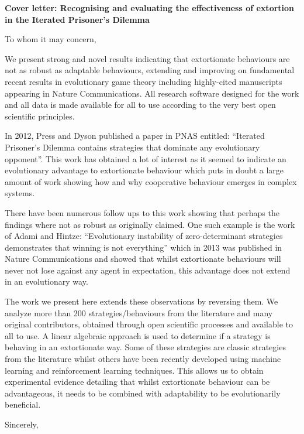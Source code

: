 \documentclass[11pt]{letter}
\begin{document}
\signature{The authors}

\begin{letter}{}

\textbf{Cover letter: Recognising and evaluating the effectiveness
       of extortion in the Iterated Prisoner's Dilemma}

To whom it may concern,

We present strong and novel results indicating that extortionate behaviours are
not as robust as adaptable behaviours, extending and improving on fundamental
recent results in evolutionary game theory including highly-cited manuscripts
appearing in Nature Communications. All research software designed for the work
and all data is made available for all to use according to the very best open
scientific principles.

In 2012, Press and Dyson published a paper in PNAS entitled: ``Iterated
Prisoner’s Dilemma contains strategies that dominate any evolutionary
opponent''. This work has obtained a lot of interest as it seemed to indicate an
evolutionary advantage to extortionate behaviour which puts in doubt a
large amount of work showing how and why cooperative behaviour emerges in
complex systems.

There have been numerous follow ups to this work showing that perhaps the
findings where not as robust as originally claimed. One such example is the work
of Adami and Hintze: ``Evolutionary instability of zero-determinant strategies
demonstrates that winning is not everything'' which in 2013 was published in
Nature Communications and showed that whilst extortionate behaviours will never
not lose against any agent in expectation, this advantage does not extend in an
evolutionary way.

The work we present here extends these observations by reversing them. We
analyze more than 200 strategies/behaviours from the literature and many
original contributors, obtained through open scientific processes and available
to all to use. A linear algebraic approach is used to determine if a strategy is
behaving in an extortionate way. Some of these strategies are classic strategies
from the literature whilst others have been recently developed using machine
learning and reinforcement learning techniques. This allows us to obtain
experimental evidence detailing that whilst extortionate behaviour can be
advantageous, it needs to be combined with adaptability to be evolutionarily
beneficial.

\closing{Sincerely,}

\end{letter}
\end{document}
